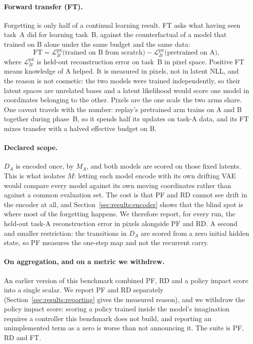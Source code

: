 \paragraph{Forward transfer (FT).} Forgetting is only half of a continual
learning result. FT asks what having seen task~A did for learning task~B, against
the counterfactual of a model that trained on B alone under the same budget and
the same data:
%
\begin{equation}
  \mathrm{FT} = \mathcal{L}^{\mathrm{px}}_{B}\big(\text{trained on B from
  scratch}\big) - \mathcal{L}^{\mathrm{px}}_{B}\big(\text{pretrained on
  A}\big),
  \label{eq:ft}
\end{equation}
%
where $\mathcal{L}^{\mathrm{px}}_{B}$ is held-out reconstruction error on task~B
in pixel space. Positive FT means knowledge of A helped. It is measured in
pixels, not in latent NLL, and the reason is not cosmetic: the two models were
trained independently, so their latent spaces are unrelated bases and a latent
likelihood would score one model in coordinates belonging to the other. Pixels
are the one scale the two arms share. One caveat travels with the number:
replay's pretrained arm trains on A and B together during phase~B, so it spends
half its updates on task-A data, and its FT mixes transfer with a halved
effective budget on B.

\paragraph{Declared scope.} $D_A$ is encoded once, by $M_A$, and both models are
scored on those fixed latents. This is what isolates $M$: letting each model
encode with its own drifting VAE would compare every model against its own
moving coordinates rather than against a common evaluation set. The cost is that
PF and RD cannot see drift in the encoder at all, and
Section~\ref{sec:results:encoder} shows that the blind spot is where most of the
forgetting happens. We therefore report, for every run, the held-out task-A
reconstruction error in pixels alongside PF and RD. A second and smaller
restriction: the transitions in $D_A$ are scored from a zero initial hidden
state, so PF measures the one-step map and not the recurrent carry.

\paragraph{On aggregation, and on a metric we withdrew.} An earlier version of
this benchmark combined PF, RD and a policy impact score into a single scalar.
We report PF and RD separately (Section~\ref{sec:results:reporting} gives the
measured reason), and we withdraw the policy impact score: scoring a policy
trained inside the model's imagination requires a controller this benchmark does
not build, and reporting an unimplemented term as a zero is worse than not
announcing it. The suite is PF, RD and FT.

